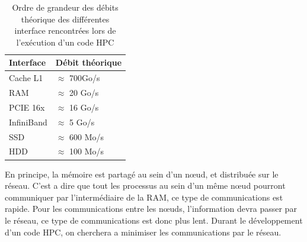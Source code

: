 \begin{table}
\begin{tabular}{ l l }
\hline 
Interface  & Débit théorique \\
\hline 
Cache L1 & $\approx$ 700Go/s \\
RAM & $\approx$ 20 Go/s \\ 
PCIE 16x & $\approx$ 16 Go/s \\
InfiniBand & $\approx$ 5 Go/s \\
SSD & $\approx$ 600 Mo/s \\
HDD & $\approx$ 100 Mo/s
\end{tabular} 
\caption{Ordre de grandeur des débits théorique des différentes interface rencontrées lors de l'exécution d'un code HPC}
\label{tab:debits}
\end{table}


En principe, la mémoire est partagé au sein d'un nœud, et distribuée sur le réseau.
C'est a dire que tout les processus au sein d'un même nœud pourront communiquer par l'intermédiaire de la RAM, ce type de communications est rapide.
Pour les communications entre les nœuds, l'information devra passer par le réseau, ce type de communications est donc plus lent.
Durant le développement d'un code HPC, on cherchera a minimiser les communications par le réseau.







